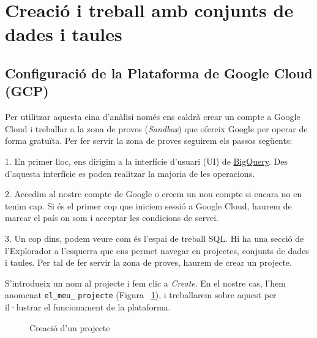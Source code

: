 \documentclass[12pt,longbibliography]{article}
\theoremstyle{definition}
\theoremstyle{remark}
\begin{document}
\pagebreak

\section{Creació i treball amb conjunts de dades i taules}

\subsection{Configuració de la Plataforma de Google Cloud (GCP)}

\graphicspath{ {BigQuery/Imatges tutorial/} }

Per utilitzar aquesta eina d’anàlisi només ens caldrà crear un compte a Google Cloud i treballar a la zona de proves (\textit{Sandbox}) que ofereix Google per operar de forma gratuïta.
Per fer servir la zona de proves seguirem els passos següents: 



1. En primer lloc, ens dirigim a la interfície d’usuari (UI) de \href{https://console.cloud.google.com}{BigQuery}. Des d'aquesta interfície es poden realitzar la majoria de les operacions.



2. Accedim al nostre compte de Google o creem un nou compte si encara no en tenim cap. Si és el primer cop que iniciem sessió a Google Cloud, haurem de marcar el país on som i acceptar les condicions de servei.



3. Un cop dins, podem veure com és l'espai de treball SQL. Hi ha una secció de l'Explorador a l'esquerra que ens permet navegar en projectes, conjunts de dades i taules. Per tal de fer servir la zona de proves, haurem de crear un projecte.

S'introdueix un nom al projecte i fem clic a \textit{Create}. En el nostre cas, l'hem anomenat \verb|el_meu_| \verb|projecte| (Figura ~\ref{fig:bq1}), i treballarem sobre aquest per il·lustrar el funcionament de la plataforma.


\begin{figure}[h!]
\par
{}%
\hfill
{}%
\par
\caption{Creació d'un projecte}
\label{fig:bq1}
\end{figure}
\end{document}
